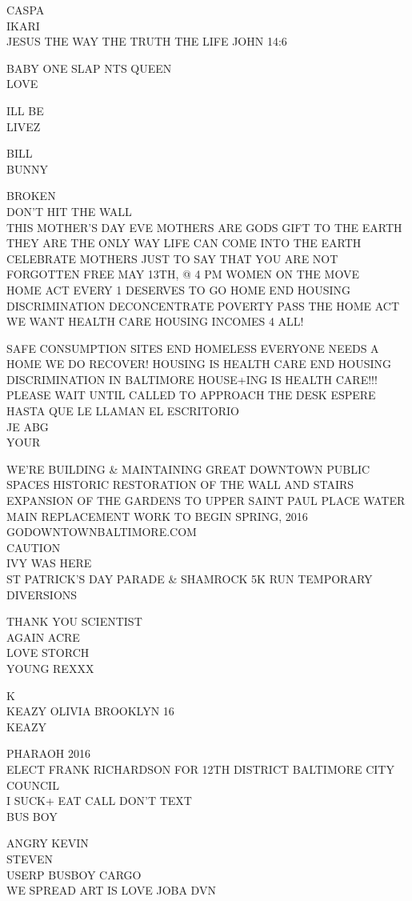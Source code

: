\documentclass[10pt,letterpaper]{article}
\begin{document}
CASPA\\
IKARI\\
JESUS THE WAY THE TRUTH THE LIFE JOHN 14:6

BABY ONE SLAP NTS QUEEN\\
LOVE

ILL BE\\
LIVEZ

BILL\\
BUNNY

BROKEN\\
DON'T HIT THE WALL\\
THIS MOTHER'S DAY EVE MOTHERS ARE GODS GIFT TO THE EARTH THEY ARE THE ONLY WAY LIFE CAN COME INTO THE EARTH CELEBRATE MOTHERS JUST TO SAY THAT YOU ARE NOT FORGOTTEN FREE MAY 13TH, @ 4 PM WOMEN ON THE MOVE\\
HOME ACT EVERY 1 DESERVES TO GO HOME END HOUSING DISCRIMINATION DECONCENTRATE POVERTY PASS THE HOME ACT WE WANT HEALTH CARE HOUSING INCOMES 4 ALL!

SAFE CONSUMPTION SITES END HOMELESS EVERYONE NEEDS A HOME WE DO RECOVER!  HOUSING IS HEALTH CARE END HOUSING DISCRIMINATION IN BALTIMORE HOUSE+ING IS HEALTH CARE!!!\\
PLEASE WAIT UNTIL CALLED TO APPROACH THE DESK ESPERE HASTA QUE LE LLAMAN EL ESCRITORIO\\
JE ABG\\
YOUR

WE'RE BUILDING \& MAINTAINING GREAT DOWNTOWN PUBLIC SPACES HISTORIC RESTORATION OF THE WALL AND STAIRS EXPANSION OF THE GARDENS TO UPPER SAINT PAUL PLACE WATER MAIN REPLACEMENT WORK TO BEGIN SPRING, 2016 GODOWNTOWNBALTIMORE.COM\\
CAUTION\\
IVY WAS HERE\\
ST PATRICK'S DAY PARADE \& SHAMROCK 5K RUN TEMPORARY DIVERSIONS

THANK YOU SCIENTIST\\
AGAIN ACRE\\
LOVE STORCH\\
YOUNG REXXX

K\\
KEAZY OLIVIA BROOKLYN 16\\
KEAZY

PHARAOH 2016\\
ELECT FRANK RICHARDSON FOR 12TH DISTRICT BALTIMORE CITY COUNCIL\\
I SUCK+ EAT CALL DON'T TEXT\\
BUS BOY

ANGRY KEVIN\\
STEVEN\\
USERP BUSBOY CARGO\\
WE SPREAD ART IS LOVE JOBA DVN
\end{document}
